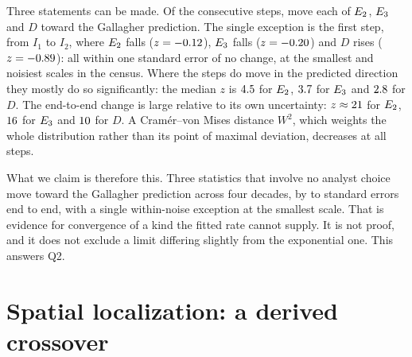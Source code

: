 \documentclass[11pt,a4paper]{article}
\begin{document}
\begin{table}[tbp]
\centering
\caption[Bootstrap standard errors at six representative intervals.]{Bootstrap standard errors at six representative intervals; all nineteen are in \texttt{local\_diagnostics.csv}.}
\label{tab:uncertainty}
{\small}
\end{table}

\begin{table}[tbp]
\centering
\caption{Consecutive-step and end-to-end tests. A step counts as ``toward the limit'' when the statistic moves toward its exponential value; $z$ is the change divided by the root-sum-square of the two bootstrap standard errors. $\beta$ is the fitted exponent in $(\logX)^{-\beta}$.}
\label{tab:steps}
{\small}
\end{table}

Three statements can be made. Of the \nSteps{} consecutive steps, \towardEtwo{} move each of $E_2$, $E_3$ and $D$ toward the Gallagher prediction. The single exception is the first step, from $I_1$ to $I_2$, where $E_2$ falls ($z=-0.12$), $E_3$ falls ($z=-0.20$) and $D$ rises ($z=-0.89$): all within one standard error of no change, at the smallest and noisiest scales in the census. Where the steps do move in the predicted direction they mostly do so significantly: the median $z$ is $4.5$ for $E_2$, $3.7$ for $E_3$ and $2.8$ for $D$. The end-to-end change is large relative to its own uncertainty: $z\approx21$ for $E_2$, $16$ for $E_3$ and $10$ for $D$. A Cram\'er--von Mises distance $W^2$, which weights the whole distribution rather than its point of maximal deviation, decreases at all \nSteps{} steps.

What we claim is therefore this. Three statistics that involve no analyst choice move toward the Gallagher prediction across four decades, by \zDEnd{} to \zEtwoEnd{} standard errors end to end, with a single within-noise exception at the smallest scale. That is evidence for convergence of a kind the fitted rate cannot supply. It is not proof, and it does not exclude a limit differing slightly from the exponential one. This answers Q2.

\section{Spatial localization: a derived crossover}
\label{sec:spatial}
\end{document}
